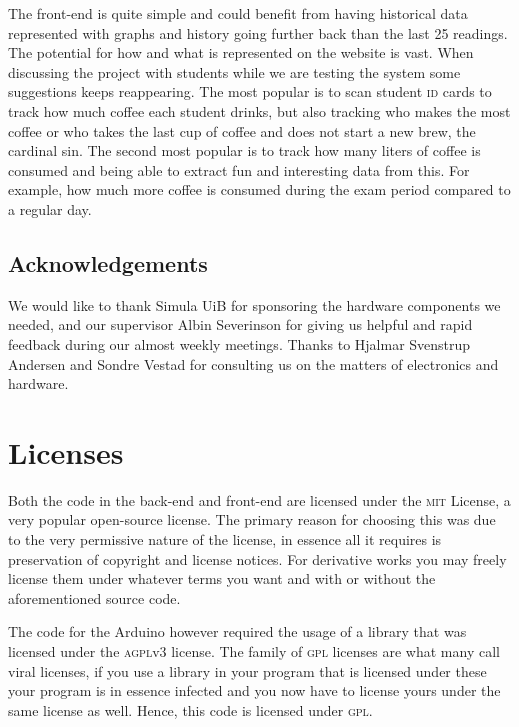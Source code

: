 \documentclass[12pt,a4paper,oneside,article]{memoir}
\numberwithin{equation}{chapter}
\begin{document}
The front-end is quite simple and could benefit from having historical data
represented with graphs and history going further back than the last 25
readings. The potential for how and what is represented on the website is vast.
When discussing the project with students while we are testing the system some
suggestions keeps reappearing. The most popular is to scan student \textsc{id}
cards to track how much coffee each student drinks, but also tracking who makes
the most coffee or who takes the last cup of coffee and does not start a new
brew, the cardinal sin. The second most popular is to track how many liters of
coffee is consumed and being able to extract fun and interesting data from this.
For example, how much more coffee is consumed during the exam period compared to
a regular day.

\section{Acknowledgements}\label{sec:acknowledgements}
We would like to thank Simula UiB for sponsoring the hardware components we
needed, and our supervisor Albin Severinson for giving us helpful and rapid
feedback during our almost weekly meetings. Thanks to Hjalmar Svenstrup Andersen
and Sondre Vestad for consulting us on the matters of electronics and hardware.

\clearpage
\appendix
\chapter{Licenses}\label{sec:licenses}
Both the code in the back-end and front-end are licensed under the \textsc{mit}
License, a very popular open-source license. The primary reason for choosing
this was due to the very permissive nature of the license, in essence all it
requires is preservation of copyright and license notices. For derivative works
you may freely license them under whatever terms you want and with or without
the aforementioned source code.

The code for the Arduino however required the usage of a library that was
licensed under the \textsc{agpl}v3 license. The family of \textsc{gpl} licenses
are what many call viral licenses, if you use a library in your program that is
licensed under these your program is in essence infected and you now have to
license yours under the same license as well. Hence, this code is licensed under
\textsc{gpl}.
\end{document}
